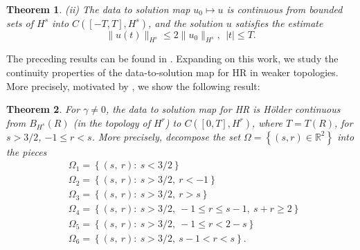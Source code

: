 \documentclass[a0,portrait]{a0poster}
\newtheorem{theorem}{Theorem}
\newcommand{\rr}{\mathbb{R}}
\begin{document}
\begin{multicols}{3}
\begin{theorem}
(ii)
The data to solution map $u_0 \mapsto u$ is continuous from
bounded sets of $H^s$ into  $C([-T, T], H^s)$,
and the solution $u$ satisfies the estimate
%
%
\begin{equation*}
\|
u(t)
\|_ {H^s}
\le
2
\|
u_0
\|_{H^s}, \ \ |t|\le T.
\end{equation*}
%
%
%
\end{theorem}
The preceding results can be found in \cite{Karapetyan:2010fk}. Expanding on
this work, we study the continuity properties of the data-to-solution map for HR
in weaker topologies. More precisely, motivated by \cite{Chen:2011fk}, we show the following result:
%
\begin{theorem}
  For $\gamma \neq 0$, the
  data to solution map for HR is H\"older continuous from $B_{H^{s}}(R)$ (in
  the topology of $H^{r}$) to $C([0, T], H^{r})$, where $T = T(R)$, for $s >
  3/2$, $-1 \le r < s$. More
  precisely, decompose the set $\Omega = \left\{ (s, r) \in \rr^{2}  \right\}$
  into the pieces
  \begin{equation*}
  \begin{split}
    & \Omega_{1} = \left\{ (s, \ r):  \ s < 3/2 \right\}
    \\
    & \Omega_{2} = \left\{ (s, \ r):
     \ s>3/2, \ r < -1  \right\}
    \\
    & \Omega_{3} = \left\{ (s, \ r):
     \ s>3/2, \ r > s  \right\}
    \\
    & \Omega_{4} = \left\{ (s, \ r):
     \ s>3/2, \ -1 \le r \le s-1, \ s + r \ge 2  \right\}
    \\
    & \Omega_{5} = \left\{ (s, \ r):
     \ s>3/2, \ -1 \le r < 2-s \right\}
    \\
    & \Omega_{6} = \left\{ (s, \ r):
    \  s>3/2, \  s-1 < r < s  \right\}.
    \end{split}
\end{equation*}
\label{thm:main-thm}
\end{theorem}
%
\begin{center}
\end{center}
\end{multicols}
\end{document}

